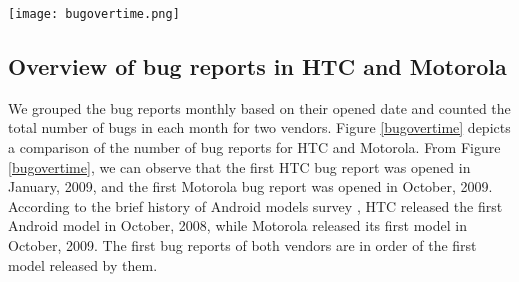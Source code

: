 \documentclass[10pt, conference, compsocconf]{IEEEtran}
\begin{document}
%
%
%

\begin{figure*}[htb]
\centering
\texttt{[image: bugovertime.png]}
\caption{Number of bugs with the major version of Android for HTC and Motorola}
\label{bugovertime}
\end{figure*}

\subsection{Overview of bug reports in HTC and Motorola}
We grouped the bug reports monthly based on their opened date and counted the total number of bugs in each month for two vendors. Figure \ref{bugovertime} depicts a comparison of the number of bug reports for HTC and Motorola.
From Figure \ref{bugovertime}, we can observe that the first HTC bug report was opened in January, 2009, and the first Motorola bug report was opened in October, 2009. According to the brief history of Android models survey \cite{historyofandroid}, HTC released the first Android model in October, 2008, while Motorola released its first model in October, 2009. The first bug reports of both vendors are in order of the first model released by them. 
\end{document}
